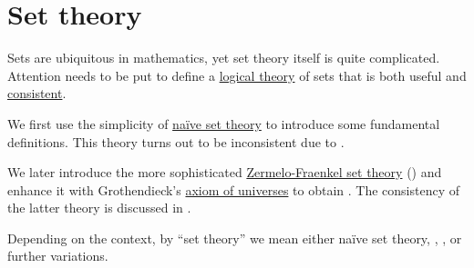 \chapter{Set theory}\label{ch:set_theory}

Sets are ubiquitous in mathematics, yet set theory itself is quite complicated. Attention needs to be put to define a \hyperref[def:first_order_theory]{logical theory} of sets that is both useful and \hyperref[def:first_order_theory/consistent]{consistent}.

We first use the simplicity of \hyperref[def:naive_set_theory]{na\"ive set theory} to introduce some fundamental definitions. This theory turns out to be inconsistent due to .

We later introduce the more sophisticated \hyperref[def:zfc]{Zermelo-Fraenkel set theory} () and enhance it with Grothendieck's \hyperref[def:axiom_of_universes]{axiom of universes} to obtain . The consistency of the latter theory is discussed in .

Depending on the context, by \enquote{set theory} we mean either na\"ive set theory, , ,  or further variations.

